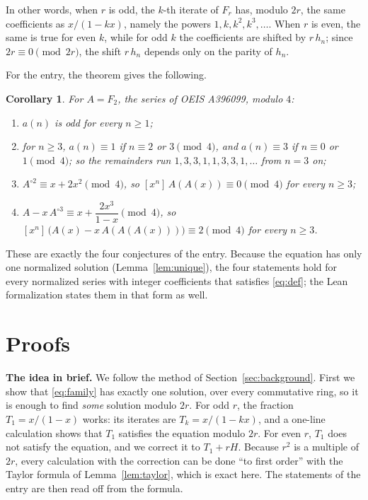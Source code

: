 \documentclass[11pt,a4paper]{article}
\newtheorem{corollary}[theorem]{Corollary}
\theoremstyle{definition}
\theoremstyle{remark}
\newcommand{\coeff}[2]{[x^{#1}]\,#2}
\newcommand{\para}[1]{\par\medskip\noindent\textbf{#1}\enspace}
\begin{document}
In other words, when $r$ is odd, the $k$-th iterate of $F_r$ has, modulo $2r$, the same coefficients as $x/(1-kx)$,
namely the powers $1,k,k^2,k^3,\dots$. When $r$ is even, the same is true for even $k$, while for odd $k$ the
coefficients are shifted by $r\,h_n$; since $2r\equiv0\pmod{2r}$, the shift $r\,h_n$ depends only on the parity of
$h_n$.

For the entry, the theorem gives the following.

\begin{corollary}\label{cor:app}
For $A=F_2$, the series of OEIS A396099, modulo $4$:
\begin{enumerate}[label=(\alph*)]
\item $a(n)$ is odd for every $n\ge1$;
\item for $n\ge3$, $a(n)\equiv1$ if $n\equiv2$ or $3\pmod4$, and $a(n)\equiv3$ if $n\equiv0$ or $1\pmod4$; so the
remainders run $1,3,3,1,1,3,3,1,\dots$ from $n=3$ on;
\item $A^{\circ2}\equiv x+2x^2\pmod4$, so $\coeff{n}{A(A(x))}\equiv0\pmod4$ for every $n\ge3$;
\item $A-x\,A^{\circ3}\equiv x+\dfrac{2x^3}{1-x}\pmod4$, so $\coeff{n}{\bigl(A(x)-x\,A(A(A(x)))\bigr)}\equiv2\pmod4$
for every $n\ge3$.
\end{enumerate}
\end{corollary}
These are exactly the four conjectures of the entry. Because the equation has only one normalized solution
(Lemma~\ref{lem:unique}), the four statements hold for every normalized series with integer coefficients that
satisfies \eqref{eq:def}; the Lean formalization states them in that form as well.

\section{Proofs}\label{sec:proofs}

\para{The idea in brief.} We follow the method of Section~\ref{sec:background}. First we show that
\eqref{eq:family} has exactly one solution, over every commutative ring, so it is enough to find \emph{some} solution
modulo $2r$. For odd $r$, the fraction $T_1=x/(1-x)$ works: its iterates are $T_k=x/(1-kx)$, and a one-line
calculation shows that $T_1$ satisfies the equation modulo $2r$. For even $r$, $T_1$ does not satisfy the equation, and we
correct it to $T_1+rH$. Because $r^2$ is a multiple of $2r$, every calculation with the correction can be done
``to first order'' with the Taylor formula of Lemma~\ref{lem:taylor}, which is exact here. The statements of the entry
are then read off from the formula.
\end{document}
